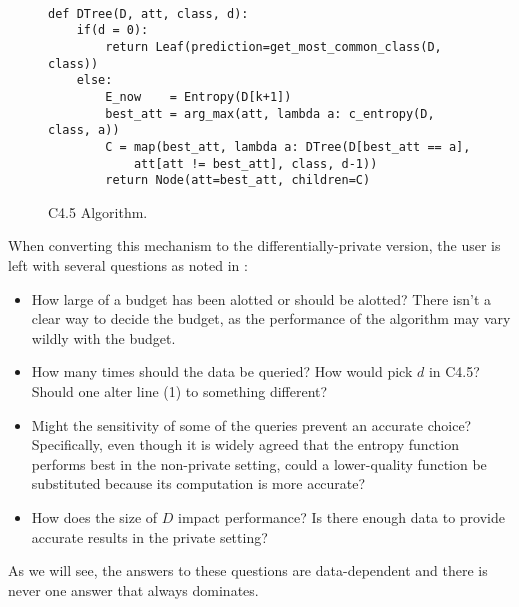 \documentclass[11pt]{article}
\begin{document}
\begin{figure}
\begin{lstlisting}

def DTree(D, att, class, d):
    if(d = 0):
        return Leaf(prediction=get_most_common_class(D, class))
    else:
        E_now    = Entropy(D[k+1])
        best_att = arg_max(att, lambda a: c_entropy(D, class, a))
        C = map(best_att, lambda a: DTree(D[best_att == a],
            att[att != best_att], class, d-1))
        return Node(att=best_att, children=C)
\end{lstlisting}
\caption{C4.5 Algorithm.}\label{alg:c45}
\end{figure}
When converting this mechanism to the differentially-private version, the user is left with several questions as noted in \cite{Fletcher:2016}:
\begin{itemize}
\item How large of a budget has been alotted or should be alotted? There isn't a clear way to decide the budget, as the performance of the algorithm may vary wildly with the budget.
\item How many times should the data be queried? How would pick $d$ in C4.5? Should one alter line (1) to something different?
\item Might the sensitivity of some of the queries prevent an accurate choice? Specifically, even though it is widely agreed that the entropy function performs best in the non-private setting, could a lower-quality function be substituted because its computation is more accurate?
\item How does the size of $D$ impact performance? Is there enough data to provide accurate results in the private setting?
\end{itemize}
As we will see, the answers to these questions are data-dependent and there is never one answer that always dominates.
\end{document}
